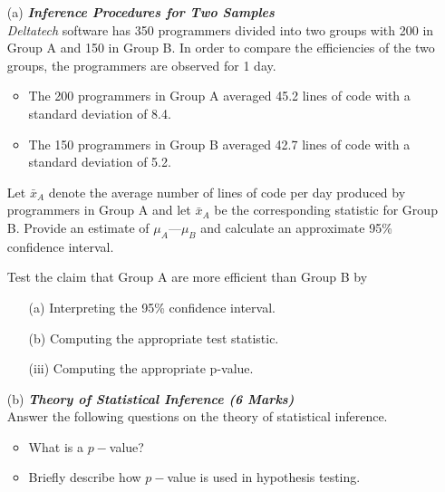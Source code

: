 


\begin{itemize}

\item[(a)] \textbf{\textit{Inference Procedures for Two Samples }}\\

\textit{Deltatech} software has 350 programmers divided into two groups with 200 in Group A
and 150 in Group B. In order to compare the efficiencies of the two groups, the
programmers are observed for 1 day.
\begin{itemize}

\item The 200 programmers in Group A averaged 45.2 lines of code with a standard
deviation of 8.4.

\item The 150 programmers in Group B averaged 42.7 lines of code with a standard
deviation of 5.2.
\end{itemize}
Let $\bar{x}_A$ denote the average number of lines of code per day produced by programmers in
Group A and
let $\bar{x}_A$ be the corresponding statistic for Group B.
Provide an estimate of $\mu_A —\mu_B$ and calculate an approximate 95\% confidence interval.

Test the claim that Group A are more efficient than Group B by
\begin{itemize}

\item[(a)]Interpreting the 95\% confidence interval.

\item[(b)] Computing the appropriate test statistic.
%
\item[(iii)] Computing the appropriate p-value.
\end{itemize}


\item[(b)] \textbf{\textit{Theory of Statistical Inference (6 Marks)}}\\Answer the following questions on the theory of statistical inference.
\begin{itemize}

\item  What is a $p-$value?

\item  Briefly describe how $p-$value is used in hypothesis testing.


\end{itemize}
\end{itemize}

